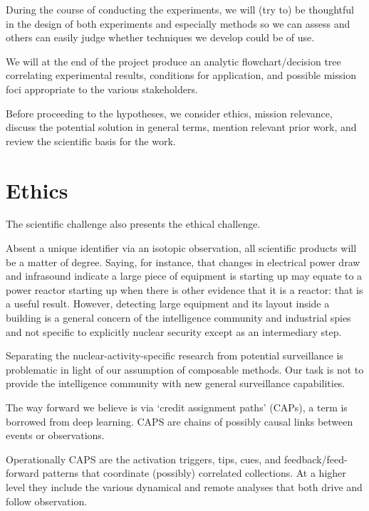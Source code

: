 \documentclass{article} %
\begin{document}
During the course of conducting the experiments, we will (try to) be thoughtful in the design of both experiments and especially methods so we can assess and others can easily judge whether techniques we develop could be of use.

We will at the end of the project produce an analytic flowchart/decision tree correlating experimental results, conditions for application, and possible mission foci appropriate to the various stakeholders.


\vspace{20 pt}
\begin{center}
\end{center}
\vspace{20 pt}

Before proceeding to the hypotheses, we consider ethics, mission relevance, discuss the potential solution in general terms, mention relevant prior work, and review the scientific basis for the work.

\pagebreak
\section {Ethics }
The scientific challenge also presents the ethical challenge. 

Absent a unique identifier via an isotopic observation, all scientific products will be a matter of degree. Saying, for instance, that changes in electrical power draw and infrasound indicate a large piece of equipment is starting up may equate to a power reactor starting up when there is other evidence that it is a reactor: that is a useful result. However, detecting large equipment and its layout inside a building is a general concern of the intelligence community and industrial spies and not specific to explicitly nuclear security except as an intermediary step.

Separating the nuclear-activity-specific research from potential surveillance is problematic in light of our assumption of composable methods. Our task is not to provide the intelligence community with new general surveillance capabilities. 

The way forward we believe is via `credit assignment paths' (CAPs), a term is borrowed from deep learning. CAPS are chains of possibly causal links between events or observations. 

Operationally CAPS are the activation triggers, tips, cues, and feedback/feed-forward patterns that coordinate (possibly) correlated collections. At a higher level they include the various dynamical and remote analyses that both drive and follow observation.
\end{document}
